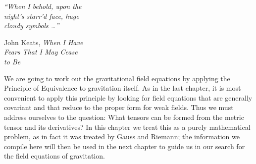 
\begin{flushright}
\begin{minipage}{0.42\textwidth}
\itshape
``When I behold, upon the\\
night's starr'd face, huge\\
cloudy symbols \ldots''

\medskip
\upshape
John Keats, \textit{When I Have\\
Fears That I May Cease\\
to Be}
\end{minipage}
\end{flushright}

We are going to work out the gravitational field equations by applying the
Principle of Equivalence to gravitation itself. As in the last chapter, it is
most convenient to apply this principle by looking for field equations that
are generally covariant and that reduce to the proper form for weak fields.
Thus we must address ourselves to the question: What tensors can be formed
from the metric tensor and its derivatives? In this chapter we treat this as a
purely mathematical problem, as in fact it was treated by Gauss and Riemann;
the information we compile here will then be used in the next chapter to guide
us in our search for the field equations of gravitation.
